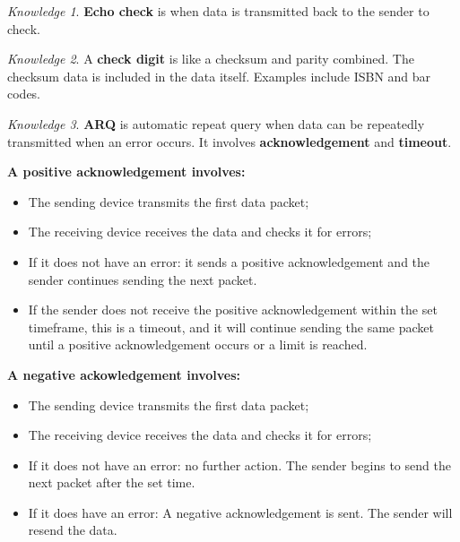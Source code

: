 \documentclass[8pt]{article}
\theoremstyle{remark}
\newtheorem{knowledge}{Knowledge}[subsection]
\begin{document}
        \begin{knowledge}
            \textbf{Echo check} is when data is transmitted back to the sender to check.
        \end{knowledge}

        \begin{knowledge}
            A \textbf{check digit} is like a checksum and parity combined. The checksum data is included in the data itself. Examples include ISBN and bar codes. 
        \end{knowledge}

        \begin{knowledge}
            \textbf{ARQ} is automatic repeat query when data can be repeatedly transmitted when an error occurs. It involves \textbf{acknowledgement} and \textbf{timeout}.

            \textbf{A positive acknowledgement involves:}
            \begin{itemize}
                \item The sending device transmits the first data packet;
                \item The receiving device receives the data and checks it for errors;
                \item If it does not have an error: it sends a positive acknowledgement and the sender continues sending the next packet.
                \item If the sender does not receive the positive acknowledgement within the set timeframe, this is a timeout, and it will continue sending the same packet until a positive acknowledgement occurs or a limit is reached.
            \end{itemize}

            \textbf{A negative ackowledgement involves:}
            \begin{itemize}
                \item The sending device transmits the first data packet;
                \item The receiving device receives the data and checks it for errors;
                \item If it does not have an error: no further action. The sender begins to send the next packet after the set time.
                \item If it does have an error: A negative acknowledgement is sent. The sender will resend the data.
            \end{itemize}
        \end{knowledge}
\end{document}
